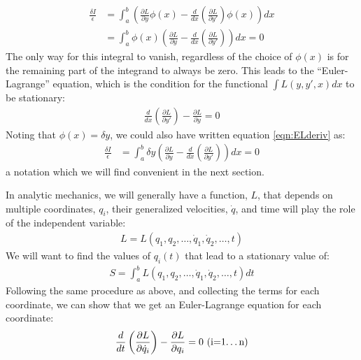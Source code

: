\begin{align}
\frac{\delta I}{\epsilon} &=\int_a^b  \left( \frac{\partial L}{\partial y}\phi(x)-\frac{d}{dx}\left(\frac{\partial L}{\partial y'}\right)\phi(x)\right)dx\nonumber\\
&=\int_a^b  \phi(x)\left( \frac{\partial L}{\partial y}-\frac{d}{dx}\left(\frac{\partial L}{\partial y'}\right)\right)dx=0
\label{eqn:ELderiv}
\end{align}
The only way for this integral to vanish, regardless of the choice of $\phi(x)$ is for the remaining part of the integrand to always be zero. This leads to the ``Euler-Lagrange'' equation, which is the condition for the functional $\int L(y,y',x)dx$ to be stationary:
\begin{align}
\frac{d}{dx}\left(\frac{\partial L}{\partial y'}\right)-\frac{\partial L}{\partial y}=0
\end{align}
Noting that $\phi(x)=\delta y$, we could also have written equation \ref{eqn:ELderiv} as:
\begin{align}
\frac{\delta I}{\epsilon} &=\int_a^b  \delta y\left( \frac{\partial L}{\partial y}-\frac{d}{dx}\left(\frac{\partial L}{\partial y'}\right)\right)dx=0
\end{align}
a notation which we will find convenient in the next section. 


\noindent
In analytic mechanics, we will generally have a function, $L$, that depends on multiple coordinates, $q_i$, their generalized velocities, $\dot{q}$, and time will play the role of the independent variable:
\begin{align}
L=L(q_1,q_2,\dots,\dot{q}_1, \dot{q}_2,\dots,t)
\end{align}
We will want to find the values of $q_i(t)$ that lead to a stationary value of:
\begin{align}
S=\int_a^b L(q_1,q_2,\dots,\dot{q}_1, \dot{q}_2,\dots,t)dt
\end{align}
Following the same procedure as above, and collecting the terms for each coordinate, we can show that we get an Euler-Lagrange equation for each coordinate:
\begin{align}
\frac{d}{dt}\left(\frac{\partial L}{\partial \dot{q}_i}\right)-\frac{\partial L}{\partial q_i}=0 \text{              (i=1\dots n)}
\end{align}


